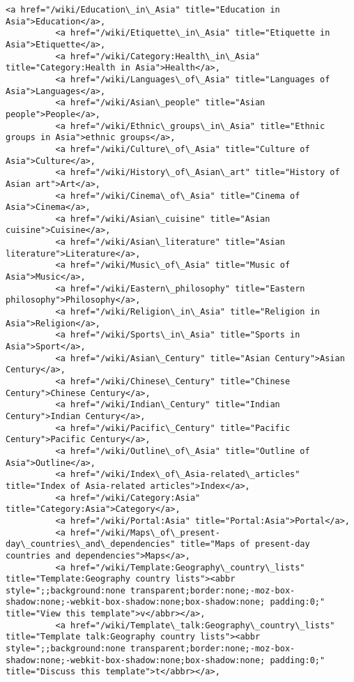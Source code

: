 \documentclass[11pt]{article}
\begin{document}
\begin{Verbatim}[commandchars=\\\{\}]
          <a href="/wiki/Education\_in\_Asia" title="Education in Asia">Education</a>,
          <a href="/wiki/Etiquette\_in\_Asia" title="Etiquette in Asia">Etiquette</a>,
          <a href="/wiki/Category:Health\_in\_Asia" title="Category:Health in Asia">Health</a>,
          <a href="/wiki/Languages\_of\_Asia" title="Languages of Asia">Languages</a>,
          <a href="/wiki/Asian\_people" title="Asian people">People</a>,
          <a href="/wiki/Ethnic\_groups\_in\_Asia" title="Ethnic groups in Asia">ethnic groups</a>,
          <a href="/wiki/Culture\_of\_Asia" title="Culture of Asia">Culture</a>,
          <a href="/wiki/History\_of\_Asian\_art" title="History of Asian art">Art</a>,
          <a href="/wiki/Cinema\_of\_Asia" title="Cinema of Asia">Cinema</a>,
          <a href="/wiki/Asian\_cuisine" title="Asian cuisine">Cuisine</a>,
          <a href="/wiki/Asian\_literature" title="Asian literature">Literature</a>,
          <a href="/wiki/Music\_of\_Asia" title="Music of Asia">Music</a>,
          <a href="/wiki/Eastern\_philosophy" title="Eastern philosophy">Philosophy</a>,
          <a href="/wiki/Religion\_in\_Asia" title="Religion in Asia">Religion</a>,
          <a href="/wiki/Sports\_in\_Asia" title="Sports in Asia">Sport</a>,
          <a href="/wiki/Asian\_Century" title="Asian Century">Asian Century</a>,
          <a href="/wiki/Chinese\_Century" title="Chinese Century">Chinese Century</a>,
          <a href="/wiki/Indian\_Century" title="Indian Century">Indian Century</a>,
          <a href="/wiki/Pacific\_Century" title="Pacific Century">Pacific Century</a>,
          <a href="/wiki/Outline\_of\_Asia" title="Outline of Asia">Outline</a>,
          <a href="/wiki/Index\_of\_Asia-related\_articles" title="Index of Asia-related articles">Index</a>,
          <a href="/wiki/Category:Asia" title="Category:Asia">Category</a>,
          <a href="/wiki/Portal:Asia" title="Portal:Asia">Portal</a>,
          <a href="/wiki/Maps\_of\_present-day\_countries\_and\_dependencies" title="Maps of present-day countries and dependencies">Maps</a>,
          <a href="/wiki/Template:Geography\_country\_lists" title="Template:Geography country lists"><abbr style=";;background:none transparent;border:none;-moz-box-shadow:none;-webkit-box-shadow:none;box-shadow:none; padding:0;" title="View this template">v</abbr></a>,
          <a href="/wiki/Template\_talk:Geography\_country\_lists" title="Template talk:Geography country lists"><abbr style=";;background:none transparent;border:none;-moz-box-shadow:none;-webkit-box-shadow:none;box-shadow:none; padding:0;" title="Discuss this template">t</abbr></a>,

\end{Verbatim}
\end{document}
